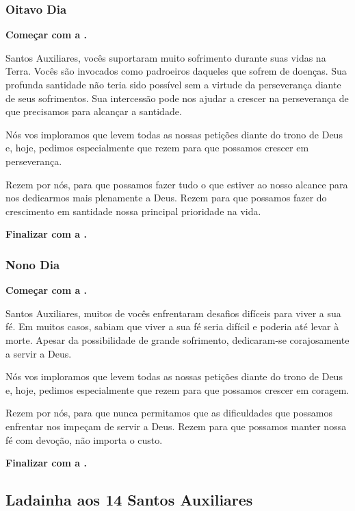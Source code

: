 \documentclass[a4paper,12pt]{extarticle} \usepackage[utf8]{inputenc}
\begin{document}
\subsubsection{Oitavo Dia}

\textbf{Começar com a .}


Santos Auxiliares, vocês suportaram muito sofrimento durante suas vidas na Terra. Vocês são invocados como padroeiros daqueles que sofrem de doenças. Sua profunda santidade não teria sido possível sem a virtude da perseverança diante de seus sofrimentos. Sua intercessão pode nos ajudar a crescer na perseverança de que precisamos para alcançar a santidade.

Nós vos imploramos que levem todas as nossas petições diante do trono de Deus e, hoje, pedimos especialmente que rezem para que possamos crescer em perseverança.

Rezem por nós, para que possamos fazer tudo o que estiver ao nosso alcance para nos dedicarmos mais plenamente a Deus. Rezem para que possamos fazer do crescimento em santidade nossa principal prioridade na vida.

\textbf{Finalizar com a .}


\subsubsection{Nono Dia}

\textbf{Começar com a .}

Santos Auxiliares, muitos de vocês enfrentaram desafios difíceis para viver a sua fé. Em muitos casos, sabiam que viver a sua fé seria difícil e poderia até levar à morte. Apesar da possibilidade de grande sofrimento, dedicaram-se corajosamente a servir a Deus.

Nós vos imploramos que levem todas as nossas petições diante do trono de Deus e, hoje, pedimos especialmente que rezem para que possamos crescer em coragem.

Rezem por nós, para que nunca permitamos que as dificuldades que possamos enfrentar nos impeçam de servir a Deus. Rezem para que possamos manter nossa fé com devoção, não importa o custo. 

\textbf{Finalizar com a .}

\newpage
\subsection{Ladainha aos 14 Santos Auxiliares} \label{ladainha}
\end{document}

